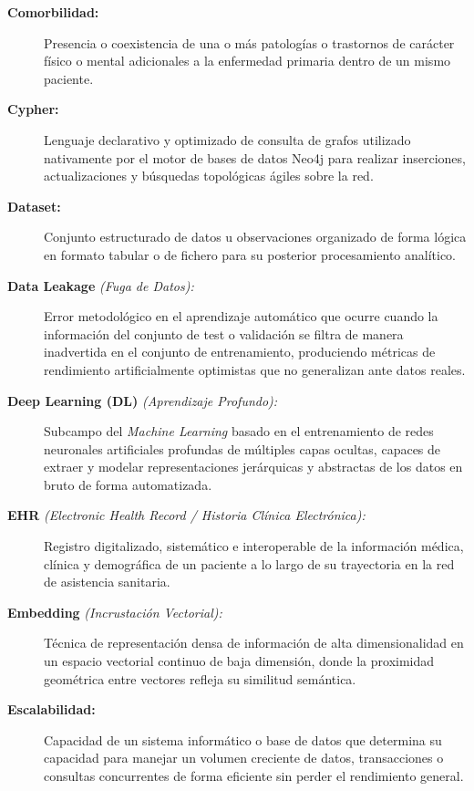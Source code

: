 \documentclass[12pt,a4paper,onecolumn,oneside]{report}
\begin{document}
\begin{description}
    \item[\textbf{Comorbilidad:}] Presencia o coexistencia de una o más patologías o trastornos de carácter físico o mental adicionales a la enfermedad primaria dentro de un mismo paciente.
    
    \item[\textbf{Cypher:}] Lenguaje declarativo y optimizado de consulta de grafos utilizado nativamente por el motor de bases de datos Neo4j para realizar inserciones, actualizaciones y búsquedas topológicas ágiles sobre la red.
    
    \item[\textbf{Dataset:}] Conjunto estructurado de datos u observaciones organizado de forma lógica en formato tabular o de fichero para su posterior procesamiento analítico.
    
    \item[\textbf{Data Leakage} \textit{(Fuga de Datos):}] Error metodológico en el aprendizaje automático que ocurre cuando la información del conjunto de test o validación se filtra de manera inadvertida en el conjunto de entrenamiento, produciendo métricas de rendimiento artificialmente optimistas que no generalizan ante datos reales.
    
    \item[\textbf{Deep Learning (DL)} \textit{(Aprendizaje Profundo):}] Subcampo del \textit{Machine Learning} basado en el entrenamiento de redes neuronales artificiales profundas de múltiples capas ocultas, capaces de extraer y modelar representaciones jerárquicas y abstractas de los datos en bruto de forma automatizada.
    
    \item[\textbf{EHR} \textit{(Electronic Health Record / Historia Clínica Electrónica):}] Registro digitalizado, sistemático e interoperable de la información médica, clínica y demográfica de un paciente a lo largo de su trayectoria en la red de asistencia sanitaria.
    
    \item[\textbf{Embedding} \textit{(Incrustación Vectorial):}] Técnica de representación densa de información de alta dimensionalidad en un espacio vectorial continuo de baja dimensión, donde la proximidad geométrica entre vectores refleja su similitud semántica.
    
    \item[\textbf{Escalabilidad:}] Capacidad de un sistema informático o base de datos que determina su capacidad para manejar un volumen creciente de datos, transacciones o consultas concurrentes de forma eficiente sin perder el rendimiento general.
    

\end{description}
\end{document}
